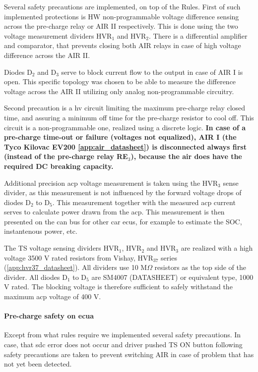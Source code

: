Several safety precautions are implemented, on top of the Rules. First of such implemented protections is HW non-programmable voltage difference sensing across the pre-charge relay or AIR II respectively. This is done using the two voltage measurement dividers HVR$_1$ and HVR$_2$. There is a differential amplifier and comparator, that prevents closing both AIR relays in case of high voltage difference across the AIR II. 

Diodes D$_2$ and D$_3$ serve to block current flow to the output in case of AIR I is open. This specific topology was chosen to be able to measure the difference voltage across the AIR II utilizing only analog non-programmable circuitry.

Second precaution is a \gls{hv} circuit limiting the maximum pre-charge relay closed time, and assuring a minimum off time for the pre-charge resistor to cool off. This circuit is a non-programmable one, realized using a discrete logic. \label{precharge_arc_breaking}\textbf{In case of a pre-charge time-out or failure (voltages not equalized), AIR I (the Tyco Kilovac EV200 \ref{app:air_datasheet}) is disconnected always first (instead of the pre-charge relay RE$_3$), because the \gls{air} does have the required DC breaking capacity.}

Additional precision \gls{acp} voltage measurement is taken using the HVR$_3$ sense divider, as this measurement is not influenced by the forward voltage drops of diodes D$_2$ to D$_5$. This measurement together with the measured \gls{acp} current serves to calculate power drawn from the \gls{acp}. This measurement is then presented on the \gls{can} bus for other car \glspl{ecu}, for example to estimate the SOC, instantenous power, etc.  

The TS voltage sensing dividers HVR$_1$, HVR$_2$ and HVR$_3$ are realized with a high voltage 3500 V rated resistors from Vishay, HVR$_{37}$ series (\ref{app:hvr37_datasheet}). All dividers use 10 M$\Omega$ resistors as the top side of the divider. All diodes D$_1$ to D$_5$ are SM4007 (DATASHEET) or equivalent type, 1000 V rated. The blocking voltage is therefore sufficient to safely withstand the maximum \gls{acp} voltage of 400 V.

\paragraph{Pre-charge safety on \gls{ecua}}
Except from what rules require we implemented several safety precautions. In case, that \gls{sdc} error does not occur and driver pushed TS ON button following safety precautions are taken to prevent switching AIR in case of problem that has not yet been detected.


